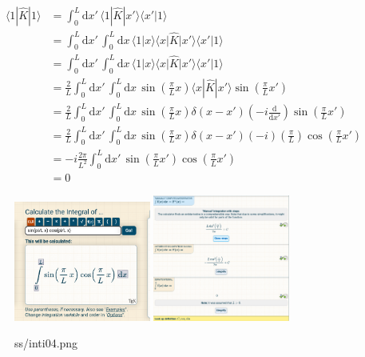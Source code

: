 \documentclass[letter]{article}
\begin{document}
\begin{align*}
	\langle 1 | \hat{K} | 1 \rangle  &= 
\int_{0}^{L} \mathrm{d} x' \, \langle 1 | \hat{K} | x' \rangle \langle x' | 1 \rangle 
	\\
					 & = 
					 \int_{0}^{L} \mathrm{d} x' \,
\int_{0}^{L} \mathrm{d} x  \,
\langle 1 | x \rangle \langle x |  \hat{K} | x' \rangle \langle x' | 1 \rangle 
	\\
					 & = 
					 \int_{0}^{L} \mathrm{d} x' \,
\int_{0}^{L} \mathrm{d} x  \,
\langle 1 | x \rangle \langle x |  \hat{K} | x' \rangle \langle x' | 1 \rangle 
	\\
	&= 
\frac{2}{L }\int_{0}^{L} \mathrm{d} x' \, 
\int_{0}^{L}  \mathrm{d} x \, 
\sin\left(\frac{\pi}{L}x\right) 
\langle x | \hat{K} | x' \rangle 
\sin\left(\frac{\pi}{L}x'\right) 
	\\
	&= 
\frac{2}{L }\int_{0}^{L} \mathrm{d} x' \, 
\int_{0}^{L}  \mathrm{d} x \, 
\sin\left(\frac{\pi}{L}x\right) 
\delta(x-x') \left(- i \frac{\mathrm{d} }{\mathrm{d} x'}\right)
\sin\left(\frac{\pi}{L}x'\right) 
	\\
	&= 
\frac{2}{L}
\int_{0}^{L} \mathrm{d} x' \, 
\int_{0}^{L}  \mathrm{d} x \, 
\sin\left(\frac{\pi}{L} x\right) \delta(x-x') \left(-i\right) \left(\frac{\pi}{L}\right) \cos(\frac{\pi}{L} x')
	\\
	&= 
-i \frac{2 \pi }{L^2} 
\int_{0}^{L} \mathrm{d} x' \,
\sin \left(\frac{\pi}{L} x'\right) \cos \left(\frac{\pi}{L}x'\right)
	\\ 
	&= 0 
\end{align*}

\begin{figure}[H]
	\centering
	\includegraphics[width=0.4\textwidth]{ss/inti03.png}
	\includegraphics[width=0.4\textwidth]{ss/inti04.png}
	\caption{ss/inti04.png}
	\label{fig:ss-inti04-png}
\end{figure}
\end{document}
